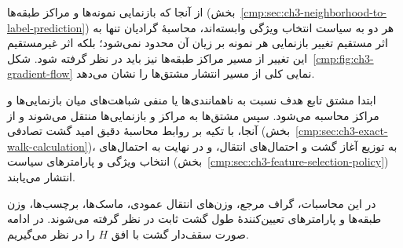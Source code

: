 از آنجا که بازنمایی نمونه‌ها و مراکز طبقه‌ها
(بخش~\ref{cmp:sec:ch3-neighborhood-to-label-prediction})
هر دو به سیاست انتخاب ویژگی وابسته‌اند،
محاسبهٔ گرادیان تنها به اثر مستقیم تغییر
بازنمایی هر نمونه بر زیان آن محدود نمی‌شود؛
بلکه اثر غیرمستقیم این تغییر از مسیر مراکز
طبقه‌ها نیز باید در نظر گرفته شود.
شکل~\ref{cmp:fig:ch3-gradient-flow} نمایی کلی
از مسیر انتشار مشتق‌ها را نشان می‌دهد.

ابتدا مشتق تابع هدف نسبت به ناهمانندی‌ها یا
منفی شباهت‌های میان بازنمایی‌ها و مراکز
محاسبه می‌شود. سپس مشتق‌ها به مراکز و
بازنمایی‌ها منتقل می‌شوند و از آنجا، با تکیه
بر روابط محاسبهٔ دقیق امید گشت تصادفی
(بخش~\ref{cmp:sec:ch3-exact-walk-calculation})،
به توزیع آغاز گشت و احتمال‌های انتقال، و
در نهایت به احتمال‌های انتخاب ویژگی و
پارامترهای سیاست
(بخش~\ref{cmp:sec:ch3-feature-selection-policy})
انتشار می‌یابند.

در این محاسبات، گراف مرجع، وزن‌های انتقال
عمودی، ماسک‌ها، برچسب‌ها، وزن طبقه‌ها و
پارامترهای تعیین‌کنندهٔ طول گشت ثابت در نظر
گرفته می‌شوند. در ادامه صورت سقف‌دار گشت
با افق $H$ را در نظر می‌گیریم.

